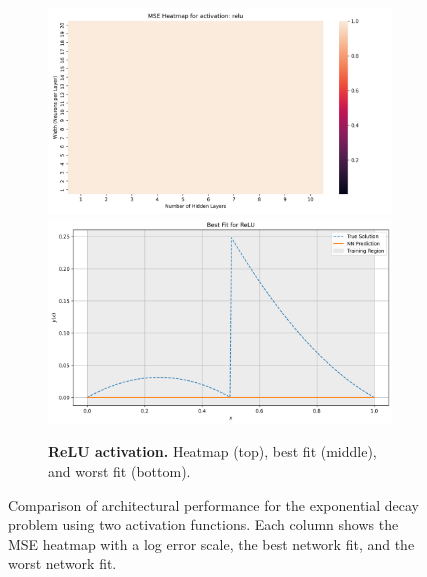 \begin{figure}[h]
    \hspace*{\fill}
    \begin{subfigure}[t]{0.48\textwidth}
        \centering
        \includegraphics[width=\textwidth]{graphics/mse_heatmap_bvp_piecewise_relu.png}
        \includegraphics[width=\textwidth]{graphics/bvp_piecewise_best_fit_relu_1layers_1width.png}
        \caption{\textbf{ReLU activation.} Heatmap (top), best fit (middle), and worst fit (bottom).}
        \label{fig:ivp_periodic_relu}
    \end{subfigure}
    \hspace*{\fill}
    \caption{Comparison of architectural performance for the exponential decay problem using two 
    activation functions. Each column shows the MSE heatmap with a log error scale,
    the best network fit, and the worst network fit.}
    \label{fig:bvp_piecewise_sidebyside}
\end{figure}
